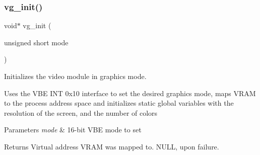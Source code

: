 \subsubsection{\texorpdfstring{vg\+\_\+init()}{vg\_init()}}
{\footnotesize\ttfamily void$\ast$ vg\+\_\+init (\begin{DoxyParamCaption}\item[{unsigned short}]{mode }\end{DoxyParamCaption})}



Initializes the video module in graphics mode. 

Uses the V\+BE I\+NT 0x10 interface to set the desired graphics mode, maps V\+R\+AM to the process\textquotesingle{} address space and initializes static global variables with the resolution of the screen, and the number of colors


\begin{DoxyParams}{Parameters}
{\em mode} & 16-\/bit V\+BE mode to set \\
\hline
\end{DoxyParams}
\begin{DoxyReturn}{Returns}
Virtual address V\+R\+AM was mapped to. N\+U\+LL, upon failure. 
\end{DoxyReturn}
